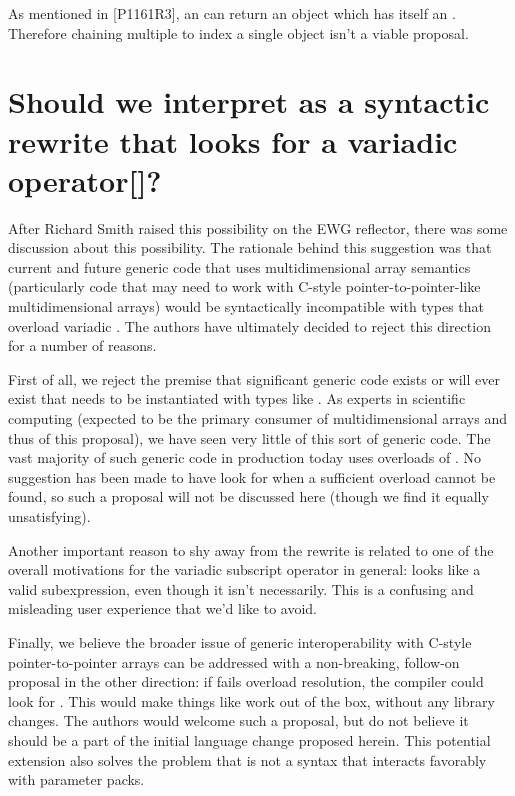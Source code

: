 \documentclass{wg21}
\begin{document}
As mentioned in [P1161R3]\cite{P1161R3}, an  can return an object which has itself an .
Therefore chaining multiple \tcode{[]} to index a single object isn't a viable proposal.

\section{Should we interpret  as a syntactic rewrite that looks for a variadic operator[]?}

After Richard Smith raised this possibility on the EWG reflector, there was some discussion about this possibility. The rationale behind this suggestion was that current and future generic code that uses multidimensional array semantics (particularly code that may need to work with C-style pointer-to-pointer-like multidimensional arrays) would be syntactically incompatible with types that overload variadic .  The authors have ultimately decided to reject this direction for a number of reasons.

First of all, we reject the premise that significant generic code exists or will ever exist that needs to be instantiated with types like . As experts in scientific computing (expected to be the primary consumer of multidimensional arrays and thus of this proposal), we have seen very little of this sort of generic code. The vast majority of such generic code in production today uses overloads of . No suggestion has been made to have  look for  when a sufficient  overload cannot be found, so such a proposal will not be discussed here (though we find it equally unsatisfying).

Another important reason to shy away from the  rewrite is related to one of the overall motivations for the variadic subscript operator in general:  looks like a valid subexpression, even though it isn't necessarily.  This is a confusing and misleading user experience that we'd like to avoid. 

Finally, we believe the broader issue of generic interoperability with C-style pointer-to-pointer arrays can be addressed with a non-breaking, follow-on proposal in the other direction: if  fails overload resolution, the compiler could look for . This would make things like  work out of the box, without any library changes. The authors would welcome such a proposal, but do not believe it should be a part of the initial language change proposed herein. This potential extension also solves the problem that  is not a syntax that interacts favorably with parameter packs.
\end{document}
